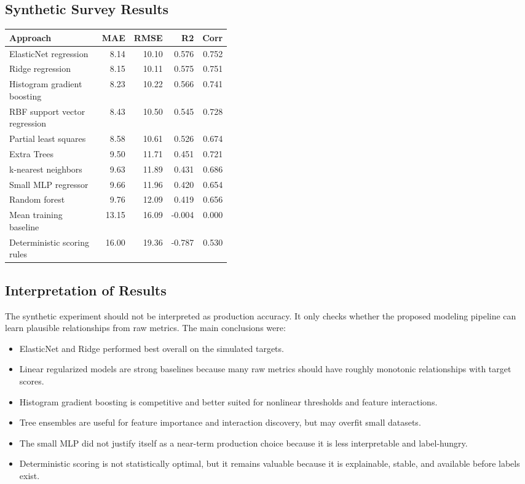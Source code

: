 \documentclass[11pt]{article}
\begin{document}
\subsection{Synthetic Survey Results}

\begin{longtable}{p{0.42\linewidth}rrrr}
\toprule
\textbf{Approach} & \textbf{MAE} & \textbf{RMSE} & \textbf{R2} & \textbf{Corr} \\
\midrule
ElasticNet regression & 8.14 & 10.10 & 0.576 & 0.752 \\
Ridge regression & 8.15 & 10.11 & 0.575 & 0.751 \\
Histogram gradient boosting & 8.23 & 10.22 & 0.566 & 0.741 \\
RBF support vector regression & 8.43 & 10.50 & 0.545 & 0.728 \\
Partial least squares & 8.58 & 10.61 & 0.526 & 0.674 \\
Extra Trees & 9.50 & 11.71 & 0.451 & 0.721 \\
k-nearest neighbors & 9.63 & 11.89 & 0.431 & 0.686 \\
Small MLP regressor & 9.66 & 11.96 & 0.420 & 0.654 \\
Random forest & 9.76 & 12.09 & 0.419 & 0.656 \\
Mean training baseline & 13.15 & 16.09 & -0.004 & 0.000 \\
Deterministic scoring rules & 16.00 & 19.36 & -0.787 & 0.530 \\
\bottomrule
\end{longtable}

\subsection{Interpretation of Results}

The synthetic experiment should not be interpreted as production accuracy. It only checks whether the proposed modeling pipeline can learn plausible relationships from raw metrics. The main conclusions were:

\begin{itemize}[leftmargin=*]
  \item ElasticNet and Ridge performed best overall on the simulated targets.
  \item Linear regularized models are strong baselines because many raw metrics should have roughly monotonic relationships with target scores.
  \item Histogram gradient boosting is competitive and better suited for nonlinear thresholds and feature interactions.
  \item Tree ensembles are useful for feature importance and interaction discovery, but may overfit small datasets.
  \item The small MLP did not justify itself as a near-term production choice because it is less interpretable and label-hungry.
  \item Deterministic scoring is not statistically optimal, but it remains valuable because it is explainable, stable, and available before labels exist.
\end{itemize}
\end{document}
